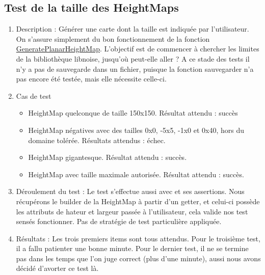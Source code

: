 \documentclass[12pt]{report}
\begin{document}
\subsection{Test de la taille des HeightMaps}
\begin{enumerate}
    \item Description : Générer une carte dont la taille est indiquée par l'utilisateur. On s'assure simplement du bon fonctionnement de la fonction \underline{GeneratePlanarHeightMap}. L'objectif est de commencer à chercher les limites de la bibliothèque libnoise, jusqu'où peut-elle aller ? A ce stade des tests il n'y a pas de sauvegarde dans un fichier, puisque la fonction sauvegarder n'a pas encore été testée, mais elle nécessite celle-ci.
    \item Cas de test
    \begin{itemize}
        \item HeightMap quelconque de taille 150x150. Résultat attendu : succès
        \item HeightMap négatives avec des tailles 0x0, -5x5, -1x0 et 0x40, hors du domaine tolérée. Résultats attendus : échec.
        \item HeightMap gigantesque. Résultat attendu : succès.
        \item HeightMap avec taille maximale autorisée. Résultat attendu : succès.
    \end{itemize}
    \item Déroulement du test : Le test s'effectue aussi avec  et ses assertions. Nous récupérons le builder de la HeightMap à partir d'un getter, et celui-ci possède les attributs de hateur et largeur passée à l'utilisateur, cela valide nos test sensés fonctionner. Pas de stratégie de test particulière appliquée.
    \item Résultats : Les trois premiers items sont tous attendus. Pour le troisième test, il a fallu patienter une bonne minute. Pour le dernier test, il ne se termine pas dans les temps que l'on juge correct (plus d'une minute), aussi nous avons décidé d'avorter ce test là.
\end{enumerate}
\end{document}
